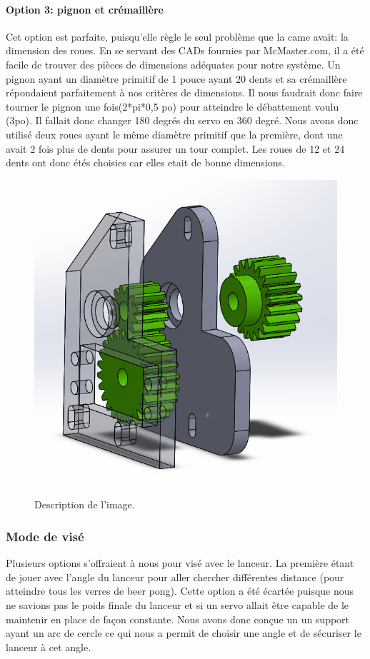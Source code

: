 \paragraph{Option 3: pignon et crémaillère}
Cet option est parfaite, puisqu’elle règle le seul problème que la came avait: la dimension des roues.
En se servant des CADs fournies par McMaster.com, il a été facile de trouver des pièces de dimensions adéquates pour notre système.
Un pignon ayant un diamètre primitif de 1 pouce ayant 20 dents et sa crémaillère répondaient parfaitement à nos critères de dimensions.
Il nous faudrait donc faire tourner le pignon une fois(2*pi*0,5 po) pour atteindre le débattement voulu (3po).
Il fallait donc changer 180 degrés du servo en 360 degré.
Nous avons donc utilisé deux roues ayant le même diamètre primitif que la première, dont une avait 2 fois plus de dents pour assurer un tour complet.
Les roues de 12 et 24 dents ont donc étés choisies car elles etait de bonne dimensions.

\begin{figure}[h!]
    \centering
    \includegraphics[width=0.5\linewidth]{img/s2/cad/gearbox1}
    \caption{Description de l'image.}
    \label{fig:s2-cad-gearbox1}
\end{figure}

\subsubsection{Mode de visé}
Plusieurs options s’offraient à nous pour visé avec le lanceur.
La première étant de jouer avec l’angle du lanceur pour aller chercher différentes distance (pour atteindre tous les verres de beer pong).
Cette option a été écartée puisque nous ne savions pas le poids finale du lanceur et si un servo allait être capable de le maintenir en place de façon constante.
Nous avons donc conçue un un support ayant un arc de cercle ce qui nous a permit de choisir une angle et de sécuriser le lanceur à cet angle.

